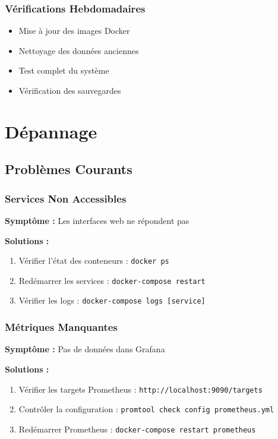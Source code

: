 \documentclass[12pt,a4paper]{report}
\newcommand{\code}[1]{\texttt{\color{primaryblue}#1}}
\begin{document}
\begin{table}[H]
\begin{itemize}
\begin{table}[H]
\subsection{Vérifications Hebdomadaires}

\begin{itemize}
    \item Mise à jour des images Docker
    \item Nettoyage des données anciennes
    \item Test complet du système
    \item Vérification des sauvegardes
\end{itemize}

\chapter{Dépannage}

\section{Problèmes Courants}

\subsection{Services Non Accessibles}

\textbf{Symptôme :} Les interfaces web ne répondent pas

\textbf{Solutions :}
\begin{enumerate}
    \item Vérifier l'état des conteneurs : \code{docker ps}
    \item Redémarrer les services : \code{docker-compose restart}
    \item Vérifier les logs : \code{docker-compose logs [service]}
\end{enumerate}

\subsection{Métriques Manquantes}

\textbf{Symptôme :} Pas de données dans Grafana

\textbf{Solutions :}
\begin{enumerate}
    \item Vérifier les targets Prometheus : \code{http://localhost:9090/targets}
    \item Contrôler la configuration : \code{promtool check config prometheus.yml}
    \item Redémarrer Prometheus : \code{docker-compose restart prometheus}
\end{enumerate}


\end{table}
\end{itemize}
\end{table}
\end{document}
